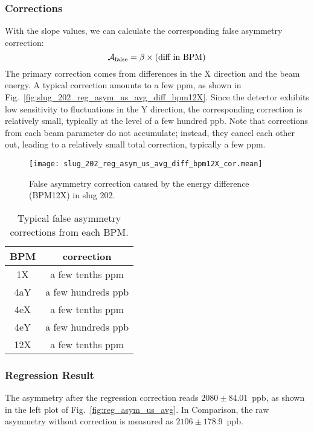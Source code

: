 \subsubsection{Corrections}
With the slope values, we can calculate the corresponding false asymmetry correction:
\begin{equation}
    \mathcal{A}_{\text{false}} = \beta \times \text{(diff in BPM)}
\end{equation}
The primary correction comes from differences in the X direction and the beam energy.
A typical correction amounts to a few ppm, as shown in 
Fig.~\ref{fig:slug_202_reg_asym_us_avg_diff_bpm12X}.
Since the detector exhibits low sensitivity to fluctuations in the Y direction, 
the corresponding correction is relatively small, typically at the level of a few hundred ppb. 
Note that corrections from each beam parameter do not accumulate; instead, they 
cancel each other out, leading to a relatively small total correction, typically a few ppm.

\begin{figure}[H]
    \centering
    \texttt{[image: slug\_202\_reg\_asym\_us\_avg\_diff\_bpm12X\_cor.mean]}
    \caption{False asymmetry correction caused by the energy difference (BPM12X) in
    slug 202.}
    \label{fig:slug_202_reg_asym_us_avg_diff_bpm12X_cor}
\end{figure}

\begin{table}[!h]
    \centering
    \begin{tabular}{c | c}
	\hline
	BPM  & correction   \\
	\hline
	1X  & a few tenths ppm \\
	4aY & a few hundreds ppb     \\
	4eX & a few tenths ppm \\
	4eY & a few hundreds ppb     \\
	12X  & a few tenths ppm \\
	\hline
    \end{tabular}
    \caption{Typical false asymmetry corrections from each BPM.}
\end{table}

\subsubsection{Regression Result}
The asymmetry after the regression correction reads $2080 \pm 84.01$~ppb, as shown 
in the left plot of Fig.~\ref{fig:reg_asym_us_avg}. In Comparison, the raw asymmetry
without correction is measured as $2106 \pm 178.9$~ppb.

